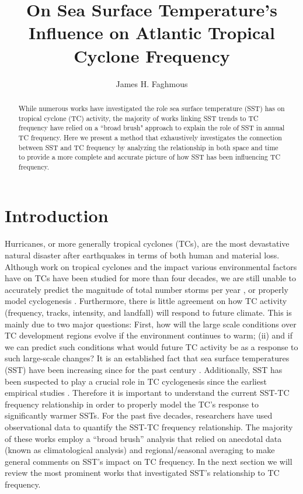 \documentclass[a4paper,10pt]{article}
\title{On Sea Surface Temperature's Influence on Atlantic Tropical Cyclone Frequency }
\author{James H. Faghmous}
\begin{document}
\maketitle

\begin{abstract}
While numerous works have investigated the role sea surface temperature (SST) has on tropical cyclone (TC) activity, the majority of works linking SST trends to TC frequency have relied on a ``broad brush" approach to explain the role of SST in annual TC frequency. Here we present a method that exhaustively investigates the connection between SST and TC frequency by analyzing the relationship in both space and time to provide a more complete and accurate picture of how SST has been influencing TC frequency.  
\end{abstract}

\section{Introduction}
Hurricanes, or more generally tropical cyclones (TCs), are the most devastative natural disaster after earthquakes in terms of both human and material loss. Although work on tropical cyclones and the impact various environmental factors have on TCs have been studied for more than four decades, we are still unable to accurately predict the magnitude of total number storms per year \cite{emanuel2008}, or properly model cyclogenesis \cite{emanuel2003, pielke2005a, emanuel2008, grossmann2008}. Furthermore, there is little agreement on how TC activity (frequency, tracks, intensity, and landfall) will respond to future climate. This is mainly due to two major questions:
First, how will the large scale conditions over TC development regions evolve if the environment continues to warm; (ii) and if we can predict such conditions what would future TC activity be as a response to such large-scale changes?
It is an established fact that sea surface temperatures (SST) have been increasing since for the past century \cite{ipcc2007}. Additionally, SST has been suspected to play a crucial role in TC cyclogenesis since the earliest empirical studies \cite{palmen1948,gray1968,carlson1971}. Therefore it is important to understand the current SST-TC frequency relationship in order to properly model the TC's response to significantly warmer SSTs. For the past five decades, researchers have used observational data to quantify the SST-TC frequency relationship. The majority of these works employ a ``broad brush'' analysis that relied on anecdotal data (known as climatological analysis) and regional/seasonal averaging to make general comments on SST's impact on TC frequency. 
In the next section we will review the most prominent works that investigated SST's relationship to TC frequency. 
\end{document}
